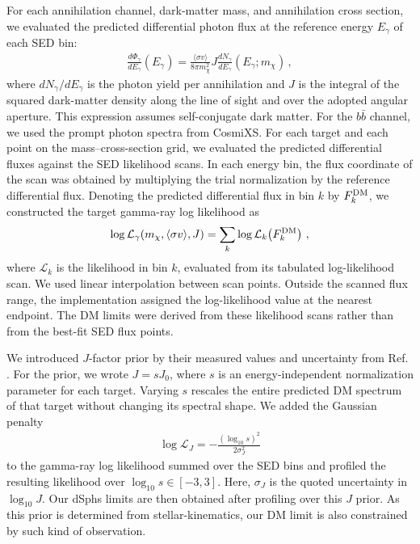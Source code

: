 \documentclass[superscriptaddress,
showpacs,preprintnumbers,nofootinbib,eqsecnum,amsmath,amssymb,aps,11pt, groupedaddress, floatfix]{revtex4-2}
\begin{document}
For each annihilation channel, dark-matter mass, and annihilation
cross section, we evaluated the predicted differential photon
flux at the reference energy \(E_\gamma\) of each SED bin:
\begin{align}
  \frac{d\Phi_\gamma}{dE_\gamma}(E_\gamma)
  =
  \frac{\langle\sigma v\rangle}{8\pi m_\chi^2}
  J
  \frac{dN_\gamma}{dE_\gamma}(E_\gamma;m_\chi)\,,
  \label{eq:dm-flux}
\end{align}
where \(dN_\gamma/dE_\gamma\) is the photon yield per annihilation and
\(J\) is the integral of the squared dark-matter density along
the line of sight and over the adopted angular aperture.
This expression assumes self-conjugate dark matter.
For the \(b\bar b\) channel, we used the prompt photon spectra
from CosmiXS.
For each target and each point on the mass--cross-section grid,
we evaluated the predicted differential fluxes against the SED
likelihood scans. 
In each energy bin, the flux coordinate of
the scan was obtained by multiplying the trial normalization
by the reference differential flux. 
Denoting the predicted
differential flux in bin \(k\) by \(F_k^{\rm DM}\), we constructed
the target gamma-ray log likelihood as
\begin{align}
  \log\mathcal L_\gamma
  (m_\chi,\langle\sigma v\rangle,J)
  =
  \sum_k
  \log\mathcal L_k\!\left(F_k^{\rm DM}\right)\,,
  \label{eq:dm-bin-likelihood}
\end{align}
where \(\mathcal L_k\) is the likelihood in bin \(k\), evaluated
from its tabulated log-likelihood scan.
We used linear interpolation between scan points. 
Outside the
scanned flux range, the implementation assigned the log-likelihood
value at the nearest endpoint.
The DM limits were derived from these likelihood scans rather
than from the best-fit SED flux points.

We introduced \(J\)-factor prior by their measured values and uncertainty from Ref. \cite{McDaniel:2023bju}. For the prior, we wrote \(J=sJ_0\), where \(s\) is
an energy-independent normalization parameter for each target.
Varying \(s\) rescales the entire predicted DM spectrum of that
target without changing its spectral shape.
We added the Gaussian penalty
\begin{align}
  \log\mathcal L_J
  =
  -\frac{(\log_{10}s)^2}{2\sigma_J^2}
  \label{eq:j-factor-penalty}
\end{align}
to the gamma-ray log likelihood summed over the SED bins and
profiled the resulting likelihood over
\(\log_{10}s\in[-3,3]\). 
Here, \(\sigma_J\) is the quoted
uncertainty in \(\log_{10}J\). Our dSphs limits are then obtained after profiling over this $J$ prior. As this prior is determined from stellar-kinematics, our DM limit is also constrained by such kind of observation.
\end{document}
